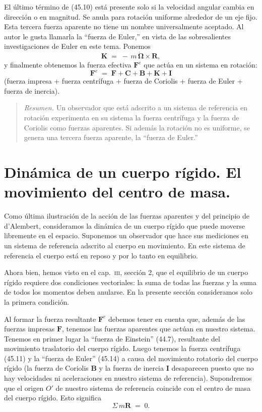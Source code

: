\documentclass[12pt,a4paper]{book}
\begin{document}
El último término de (45.10) está presente solo si la velocidad angular cambia en dirección o en magnitud. Se anula para rotación uniforme alrededor de un eje fijo. Esta tercera fuerza aparente no tiene un nombre universalmente aceptado. Al autor le gusta llamarla la ``fuerza de Euler,'' en vista de las sobresalientes investigaciones de Euler en este tema. Ponemos
\begin{equation}
\mathbf{K} \;=\; -\,m\,\dot{\mathbf{\Omega}} \times \mathbf{R}, \tag{45.14}
\end{equation}
y finalmente obtenemos la fuerza efectiva $\mathbf{F}^e$ que actúa en un sistema en rotación:
\begin{equation}
\mathbf{F}^e \;=\; \mathbf{F} + \mathbf{C} + \mathbf{B} + \mathbf{K} + \mathbf{I} \tag{45.15}
\end{equation}
(fuerza impresa + fuerza centrífuga + fuerza de Coriolis + fuerza de Euler + fuerza de inercia).

\begin{quote}
\textit{Resumen.} Un observador que está adscrito a un sistema de referencia en rotación experimenta en su sistema la fuerza centrífuga y la fuerza de Coriolis como fuerzas aparentes. Si además la rotación no es uniforme, se genera una tercera fuerza aparente, la ``fuerza de Euler.''
\end{quote}

\section{Dinámica de un cuerpo rígido. El movimiento del centro de masa.}

Como última ilustración de la acción de las fuerzas aparentes y del principio de d'Alembert, consideramos la dinámica de un cuerpo rígido que puede moverse libremente en el espacio. Suponemos un observador que hace sus mediciones en un sistema de referencia adscrito al cuerpo en movimiento. En este sistema de referencia el cuerpo está en reposo y por lo tanto en equilibrio.

Ahora bien, hemos visto en el cap.\ \textsc{iii}, sección 2, que el equilibrio de un cuerpo rígido requiere dos condiciones vectoriales: la suma de todas las fuerzas y la suma de todos los momentos deben anularse. En la presente sección consideramos solo la primera condición.

Al formar la fuerza resultante $\mathbf{F}^e$ debemos tener en cuenta que, además de las fuerzas impresas $\mathbf{F}$, tenemos las fuerzas aparentes que actúan en nuestro sistema. Tenemos en primer lugar la ``fuerza de Einstein'' (44.7), resultante del movimiento traslatorio del cuerpo rígido. Luego tenemos la fuerza centrífuga (45.11) y la ``fuerza de Euler'' (45.14) a causa del movimiento rotatorio del cuerpo rígido (la fuerza de Coriolis $\mathbf{B}$ y la fuerza de inercia $\mathbf{I}$ desaparecen puesto que no hay velocidades ni aceleraciones en nuestro sistema de referencia). Supondremos que el origen $O'$ de nuestro sistema de referencia coincide con el centro de masa del cuerpo rígido. Esto significa
\begin{equation}
\Sigma\, m\mathbf{R} \;=\; 0. \tag{46.1}
\end{equation}
\end{document}
